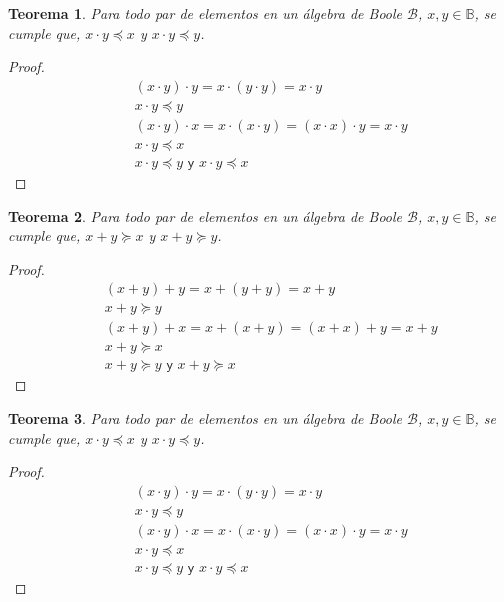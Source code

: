 \documentclass[final,12pt,a4paper,twoside,fleqn]{extbook}
\newcommand{\setB}{\ensuremath{\mathbb{B}}}
\newcommand{\algB}{\ensuremath{\mathscr{B}}}
\newtheorem{thm}{Teorema}[chapter]
\theoremstyle{definition}
\theoremstyle{remark}
\begin{document}
\begin{thm}
Para todo par de elementos en un álgebra de Boole \(\algB\), \(x,y \in
\setB\), se cumple que, \(x\cdot y \preccurlyeq x\) y \(x\cdot y \preccurlyeq
y\).
\end{thm}



\begin{proof}
\begin{eqnarray}
&& (x \cdot y) \cdot y = x \cdot (y \cdot y) = x \cdot y\\
&& x \cdot y \preccurlyeq y\\
&& (x \cdot y) \cdot x = x \cdot (x \cdot y) = (x \cdot x) \cdot y = x \cdot
y\\
&& x \cdot y \preccurlyeq x\\
&& x \cdot y \preccurlyeq y \textsf{  y  } x \cdot y \preccurlyeq x
\end{eqnarray}
\end{proof}



\begin{thm}
Para todo par de elementos en un álgebra de Boole \( \algB \), \( x , y \in
\setB \), se cumple que, \( x + y \succcurlyeq x \) y \( x + y \succcurlyeq
y \).
\end{thm}



\begin{proof}
\begin{eqnarray}
&& (x + y) + y = x + (y + y) = x + y\\
&& x + y \succcurlyeq y\\
&& (x + y) + x = x + (x + y) = (x + x) + y = x + y\\
&& x + y \succcurlyeq x\\
&& x + y \succcurlyeq y \textsf{  y  } x + y \succcurlyeq x
\end{eqnarray}
\end{proof}



\begin{thm}
Para todo par de elementos en un álgebra de Boole \( \algB \), \( x , y \in
\setB \), se cumple que, \( x \cdot y \preccurlyeq x \) y \( x \cdot y \preccurlyeq y \).
\end{thm}



\begin{proof}
\begin{eqnarray}
&& (x \cdot y) \cdot y = x \cdot (y \cdot y) = x \cdot y\\
&& x \cdot y \preccurlyeq y\\
&& (x \cdot y) \cdot x = x \cdot (x \cdot y) = (x \cdot x) \cdot y = x \cdot
y\\
&& x \cdot y \preccurlyeq x\\
&& x \cdot y \preccurlyeq y \textsf{  y  } x \cdot y \preccurlyeq x
\end{eqnarray}
\end{proof}
\end{document}
